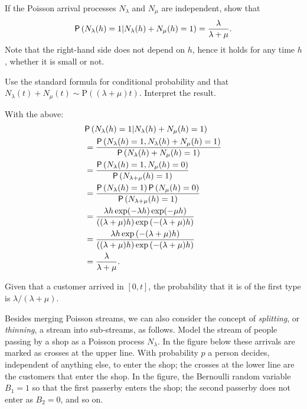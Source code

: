 \begin{extra}
 If the Poisson arrival processes $N_\lambda$ and $N_\mu$ are independent, show that
 \begin{equation*}
 \P{N_\lambda(h) = 1 | N_\lambda(h) + N_\mu(h) = 1} =
\frac{\lambda}{\lambda+\mu}.
 \end{equation*}
 Note that the right-hand side does not depend on $h$, hence it
 holds for any time $h$, whether it is small or not. 
\begin{hint}
Use the standard formula for conditional probability and that $N_\lambda(t) + N_\mu(t) \sim \text{P}((\lambda + \mu)t)$. Interpret the result.
\end{hint}
\begin{solution}
 With the above:
 \begin{align*}
& \P{N_\lambda(h) = 1 | N_\lambda(h) + N_\mu(h) = 1} \\
&= \frac{\P{N_\lambda(h) = 1, N_\lambda(h) + N_\mu(h) = 1} }{ \P{N_\lambda(h) + N_\mu(h) = 1}} \\ 
&= \frac{\P{N_\lambda(h) = 1, N_\mu(h) = 0}}{ \P{N_{\lambda+\mu}(h) = 1}} \\ 
&= \frac{\P{N_\lambda(h) = 1}\P{N_\mu(h) = 0}}{ \P{N_{\lambda+\mu}(h) = 1}} \\ 
&= \frac{\lambda h \exp(-\lambda h) \exp(-\mu h)}{((\lambda+\mu)h)\exp{(-(\lambda+\mu)h)}}\\
&= \frac{\lambda h \exp{(-(\lambda + \mu)h)}}{((\lambda+\mu)h)\exp{(-(\lambda+\mu)h)}}\\
&= \frac{\lambda}{\lambda+\mu}.
 \end{align*}

 Given that a customer arrived in $[0,t]$, the probability that it is of the first type is $\lambda/(\lambda+\mu)$. 
\end{solution}
\end{extra}


Besides merging Poisson streams, we can also consider the concept of \emph{splitting}, or \emph{thinning}, a stream into sub-streams, as follows.
Model the stream of people passing by a shop as a Poisson process $N_\lambda$. In the figure below these arrivals are marked as crosses at the upper line. 
With probability $p$ a person decides, independent of anything else, to enter the shop; the crosses at the lower line are the customers that enter the shop.
In the figure, the Bernoulli random variable $B_1=1$ so that the first passerby enters the shop; the second passerby does not enter as $B_2=0$, and so on.

